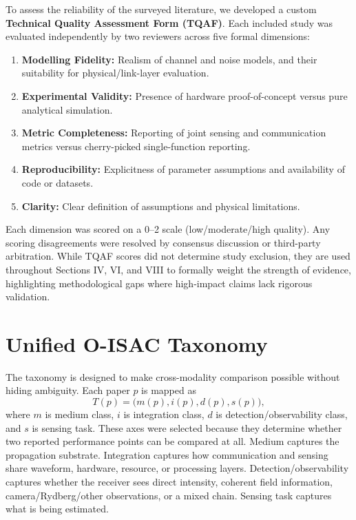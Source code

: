 \documentclass[letterpaper,journal]{IEEEtran}
\begin{document}
To assess the reliability of the surveyed literature, we developed a custom \textbf{Technical Quality Assessment Form (TQAF)}. Each included study was evaluated independently by two reviewers across five formal dimensions:
\begin{enumerate}
    \item \textbf{Modelling Fidelity:} Realism of channel and noise models, and their suitability for physical/link-layer evaluation.
    \item \textbf{Experimental Validity:} Presence of hardware proof-of-concept versus pure analytical simulation.
    \item \textbf{Metric Completeness:} Reporting of joint sensing and communication metrics versus cherry-picked single-function reporting.
    \item \textbf{Reproducibility:} Explicitness of parameter assumptions and availability of code or datasets.
    \item \textbf{Clarity:} Clear definition of assumptions and physical limitations.
\end{enumerate}

Each dimension was scored on a 0--2 scale (low/moderate/high quality). Any scoring disagreements were resolved by consensus discussion or third-party arbitration. While TQAF scores did not determine study exclusion, they are used throughout Sections IV, VI, and VIII to formally weight the strength of evidence, highlighting methodological gaps where high-impact claims lack rigorous validation.

\section{Unified O-ISAC Taxonomy}
\label{sec:taxonomy}

The taxonomy is designed to make cross-modality comparison possible without hiding ambiguity. Each paper \(p\) is mapped as
\begin{equation}
    T(p)=\bigl(m(p),i(p),d(p),s(p)\bigr),
    \label{eq:taxonomy_vector}
\end{equation}
where \(m\) is medium class, \(i\) is integration class, \(d\) is detection/observability class, and \(s\) is sensing task. These axes were selected because they determine whether two reported performance points can be compared at all. Medium captures the propagation substrate. Integration captures how communication and sensing share waveform, hardware, resource, or processing layers. Detection/observability captures whether the receiver sees direct intensity, coherent field information, camera/Rydberg/other observations, or a mixed chain. Sensing task captures what is being estimated.
\end{document}
